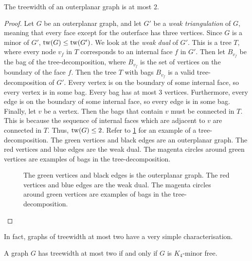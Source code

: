 \begin{proposition}\label{ex:tw_outerplanar}
	The treewidth of an outerplanar graph is at most 2.
\end{proposition}
\begin{proof}
	Let \(G\) be an outerplanar graph, and let \(G'\) be a \textit{weak triangulation} of \(G\), meaning that every face except for the outerface has three vertices. Since \(G\) is a minor of \(G'\), \(\operatorname{tw}(G) \leq \operatorname{tw}(G')\). We look at the \textit{weak dual} of \(G'\). This is a tree \(T\), where every node \(v_f\) in \(T\) corresponds to an internal face \(f\) in \(G'\). Then let \(B_{v_f}\) be the bag of the tree-decomposition, where \(B_{v_f}\) is the set of vertices on the boundary of the face \(f\). Then the tree \(T\) with bags \(B_{v_f}\) is a valid tree-decomposition of \(G'\). Every vertex is on the boundary of some internal face, so every vertex is in some bag. Every bag has at most 3 vertices. Furthermore, every edge is on the boundary of some internal face, so every edge is in some bag. Finally, let $v$ be a vertex. Then the bags that contain $v$ must be connected in $T$. This is because the sequence of internal faces which are adjacent to $v$ are connected in $T$. Thus, \(\operatorname{tw}(G) \leq 2\). Refer to \cref{fig:outerplanar_treedecomp} for an example of a tree-decomposition. The green vertices and black edges are an outerplanar graph. The red vertices and blue edges are the weak dual. The magenta circles around green vertices are examples of bags in the tree-decomposition.
	\begin{figure}[h!]
		\centering
		
		\caption[Tree-decomposition of outerplanar graph.]{The green vertices and black edges is the outerplanar graph. The red vertices and blue edges are the weak dual. The magenta circles around green vertices are examples of bags in the tree-decomposition.}\label{fig:outerplanar_treedecomp}
	\end{figure}
\end{proof}

In fact, graphs of treewidth at most two have a very simple characterisation.

\begin{proposition}\label{prop:k4-minor}
	A graph $G$ has treewidth at most two if and only if $G$ is $K_4$-minor free. 
\end{proposition}

